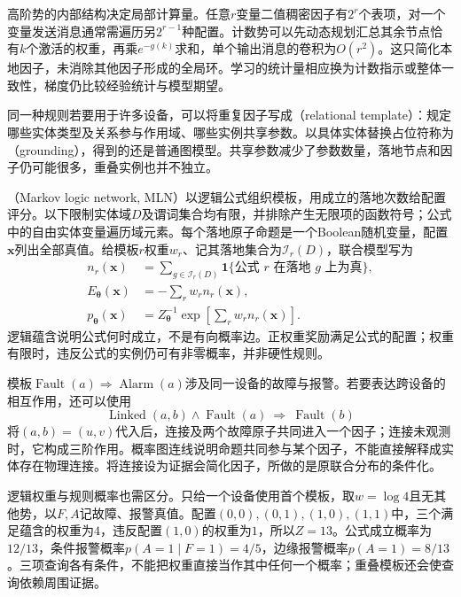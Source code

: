高阶势的内部结构决定局部计算量。任意$r$变量二值稠密因子有$2^r$个表项，对一个变量发送消息通常需遍历另$2^{r-1}$种配置。计数势可以先动态规划汇总其余节点恰有$k$个激活的权重，再乘$e^{-g(k)}$求和，单个输出消息的卷积为$O(r^2)$。这只简化本地因子，未消除其他因子形成的全局环。学习的统计量相应换为计数指示或整体一致性，梯度仍比较经验统计与模型期望。

同一种规则若要用于许多设备，可以将重复因子写成（relational template）：规定哪些实体类型及关系参与作用域、哪些实例共享参数。以具体实体替换占位符称为（grounding），得到的还是普通图模型。共享参数减少了参数数量，落地节点和因子仍可能很多，重叠实例也并不独立。

（Markov logic network, MLN）以逻辑公式组织模板，用成立的落地次数给配置评分。以下限制实体域$D$及谓词集合均有限，并排除产生无限项的函数符号；公式中的自由实体变量遍历域元素。每个落地原子命题是一个Boolean随机变量，配置$\bm{x}$列出全部真值。给模板$r$权重$w_r$、记其落地集合为$\mathcal{I}_r(D)$，联合模型写为
\begin{equation}
  \begin{aligned}
    n_r(\bm{x})
      &=\sum_{g\in\mathcal{I}_r(D)}
           \mathbf{1}\{\text{公式 }r\text{ 在落地 }g\text{ 上为真}\},\\
    E_{\bm{\theta}}(\bm{x})&=-\sum_rw_rn_r(\bm{x}),\\
    p_{\bm{\theta}}(\bm{x})
      &=Z_{\bm{\theta}}^{-1}
          \exp\!\left[\sum_rw_rn_r(\bm{x})\right].
  \end{aligned}
  \label{eq:pgm-energy-models-mln}
\end{equation}
逻辑蕴含说明公式何时成立，不是有向概率边。正权重奖励满足公式的配置；权重有限时，违反公式的实例仍可有非零概率，并非硬性规则。

模板$\operatorname{Fault}(a)\Rightarrow\operatorname{Alarm}(a)$涉及同一设备的故障与报警。若要表达跨设备的相互作用，还可以使用
\[
  \operatorname{Linked}(a,b)\land\operatorname{Fault}(a)
       \ \Rightarrow\ \operatorname{Fault}(b)
\]
将$(a,b)=(u,v)$代入后，连接及两个故障原子共同进入一个因子；连接未观测时，它构成三阶作用。概率图连线说明命题共同参与某个因子，不能直接解释成实体存在物理连接。将连接设为证据会简化因子，所做的是原联合分布的条件化。

逻辑权重与规则概率也需区分。只给一个设备使用首个模板，取$w=\log4$且无其他势，以$F,A$记故障、报警真值。配置$(0,0),(0,1),(1,0),(1,1)$中，三个满足蕴含的权重为$4$，违反配置$(1,0)$的权重为$1$，所以$Z=13$。公式成立概率为$12/13$，条件报警概率$p(A=1\mid F=1)=4/5$，边缘报警概率$p(A=1)=8/13$。三项查询各有条件，不能把权重直接当作其中任何一个概率；重叠模板还会使查询依赖周围证据。


